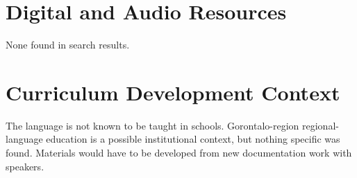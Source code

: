 \documentclass[12pt]{article}
\begin{document}
\section{Digital and Audio Resources}
None found in search results.

\section{Curriculum Development Context}
The language is not known to be taught in schools. Gorontalo-region regional-language education is a possible institutional context, but nothing specific was found. Materials would have to be developed from new documentation work with speakers.
\end{document}
